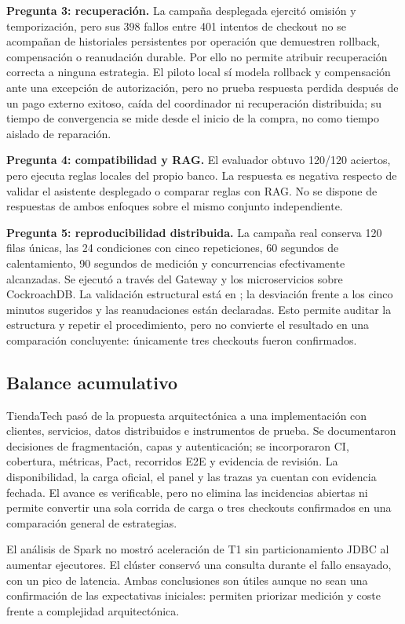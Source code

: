 \documentclass[12pt,a4paper]{article}
\begin{document}
\textbf{Pregunta 3: recuperación.} La campaña desplegada ejercitó omisión y temporización, pero sus 398 fallos entre 401 intentos de checkout no se acompañan de historiales persistentes por operación que demuestren rollback, compensación o reanudación durable. Por ello no permite atribuir recuperación correcta a ninguna estrategia. El piloto local sí modela rollback y compensación ante una excepción de autorización, pero no prueba respuesta perdida después de un pago externo exitoso, caída del coordinador ni recuperación distribuida; su tiempo de convergencia se mide desde el inicio de la compra, no como tiempo aislado de reparación.

\textbf{Pregunta 4: compatibilidad y RAG.} El evaluador obtuvo 120/120 aciertos, pero ejecuta reglas locales del propio banco. La respuesta es negativa respecto de validar el asistente desplegado o comparar reglas con RAG. No se dispone de respuestas de ambos enfoques sobre el mismo conjunto independiente.

\textbf{Pregunta 5: reproducibilidad distribuida.} La campaña real conserva 120 filas únicas, las 24 condiciones con cinco repeticiones, 60 segundos de calentamiento, 90 segundos de medición y concurrencias efectivamente alcanzadas. Se ejecutó a través del Gateway y los microservicios sobre CockroachDB. La validación estructural está en ; la desviación frente a los cinco minutos sugeridos y las reanudaciones están declaradas. Esto permite auditar la estructura y repetir el procedimiento, pero no convierte el resultado en una comparación concluyente: únicamente tres checkouts fueron confirmados.

\subsection{Balance acumulativo}
TiendaTech pasó de la propuesta arquitectónica a una implementación con clientes, servicios, datos distribuidos e instrumentos de prueba. Se documentaron decisiones de fragmentación, capas y autenticación; se incorporaron CI, cobertura, métricas, Pact, recorridos E2E y evidencia de revisión. La disponibilidad, la carga oficial, el panel y las trazas ya cuentan con evidencia fechada. El avance es verificable, pero no elimina las incidencias abiertas ni permite convertir una sola corrida de carga o tres checkouts confirmados en una comparación general de estrategias.

El análisis de Spark no mostró aceleración de T1 sin particionamiento JDBC al aumentar ejecutores. El clúster conservó una consulta durante el fallo ensayado, con un pico de latencia. Ambas conclusiones son útiles aunque no sean una confirmación de las expectativas iniciales: permiten priorizar medición y coste frente a complejidad arquitectónica.
\end{document}
